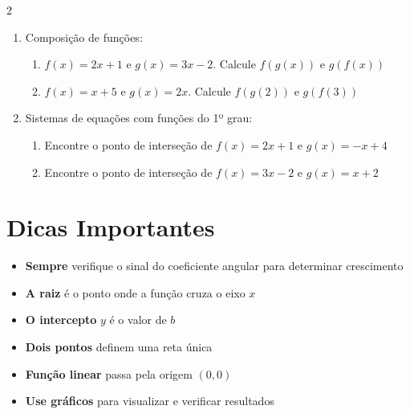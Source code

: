 \documentclass[11pt]{article}
\begin{document}
\begin{multicols}{2}
\begin{enumerate}[leftmargin=*, start=8]
\item Composição de funções:
\begin{enumerate}[label=\alph*)]
\item $f(x) = 2x + 1$ e $g(x) = 3x - 2$. Calcule $f(g(x))$ e $g(f(x))$
\item $f(x) = x + 5$ e $g(x) = 2x$. Calcule $f(g(2))$ e $g(f(3))$
\end{enumerate}

\item Sistemas de equações com funções do 1º grau:
\begin{enumerate}[label=\alph*)]
\item Encontre o ponto de interseção de $f(x) = 2x + 1$ e $g(x) = -x + 4$
\item Encontre o ponto de interseção de $f(x) = 3x - 2$ e $g(x) = x + 2$
\end{enumerate}

\end{enumerate}

\section*{Dicas Importantes}

\begin{itemize}
\item \textbf{Sempre} verifique o sinal do coeficiente angular para determinar crescimento
\item \textbf{A raiz} é o ponto onde a função cruza o eixo $x$
\item \textbf{O intercepto} $y$ é o valor de $b$
\item \textbf{Dois pontos} definem uma reta única
\item \textbf{Função linear} passa pela origem $(0, 0)$
\item \textbf{Use gráficos} para visualizar e verificar resultados
\end{itemize}

\end{multicols}
\end{document}
